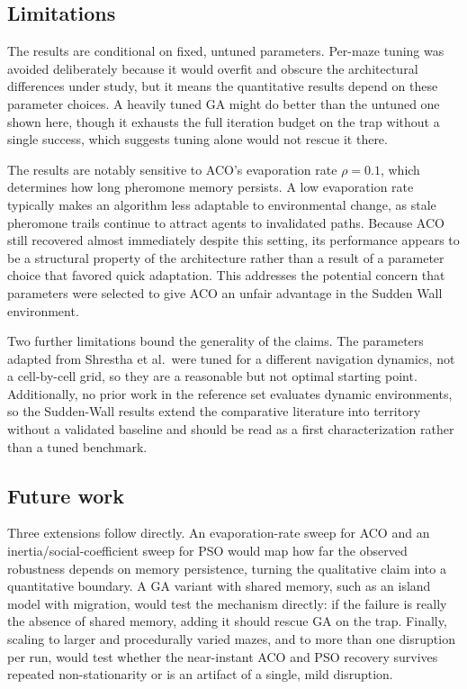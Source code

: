 \documentclass[11pt,a4paper]{article}
\begin{document}
    \subsection{Limitations}
    The results are conditional on fixed, untuned parameters. Per-maze tuning was avoided deliberately because it would overfit and obscure the architectural differences under study, but it means the quantitative results depend on these parameter choices. A heavily tuned GA might do better than the untuned one shown here, though it exhausts the full iteration budget on the trap without a single success, which suggests tuning alone would not rescue it there.

    The results are notably sensitive to ACO's evaporation rate $\rho=0.1$, which determines how long pheromone memory persists. A low evaporation rate typically makes an algorithm less adaptable to environmental change, as stale pheromone trails continue to attract agents to invalidated paths. Because ACO still recovered almost immediately despite this setting, its performance appears to be a structural property of the architecture rather than a result of a parameter choice that favored quick adaptation. This addresses the potential concern that parameters were selected to give ACO an unfair advantage in the Sudden Wall environment.

    Two further limitations bound the generality of the claims. The parameters adapted from Shrestha et al.\ were tuned for a different navigation dynamics, not a cell-by-cell grid, so they are a reasonable but not optimal starting point. Additionally, no prior work in the reference set evaluates dynamic environments, so the Sudden-Wall results extend the comparative literature into territory without a validated baseline and should be read as a first characterization rather than a tuned benchmark.

    \subsection{Future work}
    Three extensions follow directly. An evaporation-rate sweep for ACO and an inertia/social-coefficient sweep for PSO would map how far the observed robustness depends on memory persistence, turning the qualitative claim into a quantitative boundary. A GA variant with shared memory, such as an island model with migration, would test the mechanism directly: if the failure is really the absence of shared memory, adding it should rescue GA on the trap. Finally, scaling to larger and procedurally varied mazes, and to more than one disruption per run, would test whether the near-instant ACO and PSO recovery survives repeated non-stationarity or is an artifact of a single, mild disruption.
\end{document}

